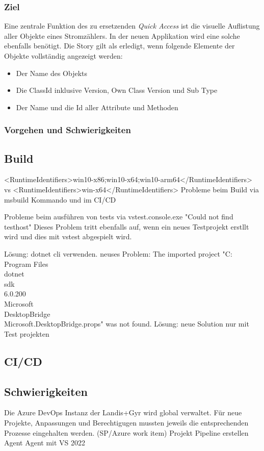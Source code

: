 \subsubsection{Ziel}
Eine zentrale Funktion des zu ersetzenden \textit{Quick Access} ist die visuelle Auflistung aller Objekte eines Stromzählers.
In der neuen Applikation wird eine solche ebenfalls benötigt.
Die Story gilt als erledigt, wenn folgende Elemente der Objekte vollständig angezeigt werden:
\begin{itemize}
   \item Der Name des Objekts
   \item Die ClassId inklusive Version, Own Class Version und Sub Type
   \item Der Name und die Id aller Attribute und Methoden
\end{itemize}

\subsubsection{Vorgehen und Schwierigkeiten}

\pagebreak

\subsection{Build}
<RuntimeIdentifiers>win10-x86;win10-x64;win10-arm64</RuntimeIdentifiers> vs <RuntimeIdentifiers>win-x64</RuntimeIdentifiers>
Probleme beim Build via msbuild Kommando und im CI/CD

Probleme beim ausführen von tests via vstest.console.exe
"Could not find testhost"
Dieses Problem tritt ebenfalls auf, wenn ein neues Testprojekt erstllt wird und dies mit vstest abgespielt wird.

Lösung:
dotnet cli verwenden. neuses Problem:  The imported project "C:\\Program Files\\dotnet\\sdk\\6.0.200\\Microsoft\\DesktopBridge\\Microsoft.DesktopBridge.props" was not found.
Lösung:
neue Solution nur mit Test projekten

\subsection{CI/CD}

\subsection{Schwierigkeiten}
Die Azure DevOps Instanz der Landis+Gyr wird global verwaltet. Für neue Projekte, Anpassungen und Berechtigugen mussten jeweils die entsprechenden Prozesse eingehalten werden. (SP/Azure work item)
Projekt
Pipeline erstellen
Agent
Agent mit VS 2022

